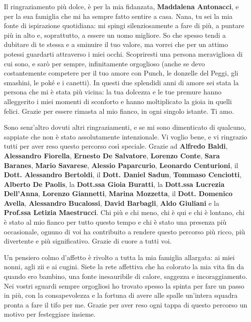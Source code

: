 \vspace{1em}

\noindent
Il ringraziamento più dolce, è per la mia fidanzata, \textbf{Maddalena Antonacci}, e per la sua famiglia che mi ha sempre fatto sentire a casa. Nana, tu sei la mia fonte di ispirazione quotidiana: mi spingi silenziosamente a fare di più, a puntare più in alto e, soprattutto, a essere un uomo migliore. So che spesso tendi a dubitare di te stessa e a sminuire il tuo valore, ma vorrei che per un attimo potessi guardarti attraverso i miei occhi. Scopriresti una persona meravigliosa di cui sono, e sarò per sempre, infinitamente orgoglioso (anche se devo costantemente competere per il tuo amore con Punch, le donzelle del Peggi, gli smashini, le poké e i canetti). In questi due splendidi anni di amore sei stata la persona che mi è stata più vicina: la tua dolcezza e le tue premure hanno alleggerito i miei momenti di sconforto e hanno moltiplicato la gioia in quelli felici. Grazie per essere rimasta al mio fianco, in ogni singolo istante. Ti amo.

\vspace{1em}

\noindent
Sono senz'altro dovuti altri ringraziamenti, e se mi sono dimenticato di qualcuno, sappiate che non è stato assolutamente intenzionale. Vi voglio bene, e vi ringrazio tutti per aver reso questo percorso così speciale.
Grazie ad \textbf{Alfredo Baldi}, \textbf{Alessandro Fiorella}, \textbf{Ernesto De Salvatore}, \textbf{Lorenzo Conte}, \textbf{Sara Baranes}, \textbf{Mario Savarese}, \textbf{Alessio Paparcurio}, \textbf{Leonardo Centurioni}, il \textbf{Dott. Alessandro Bertoldi}, il \textbf{Dott. Daniel Sadun}, \textbf{Tommaso Cenciotti}, \textbf{Alberto De Paolis}, la \textbf{Dott.ssa Gioia Buratti}, la \textbf{Dott.ssa Lucrezia Dell'Anna}, \textbf{Lorenzo Giannetti}, \textbf{Marina Mozzetta}, il \textbf{Dott. Domenico Avella}, \textbf{Alessandro Bucalossi}, \textbf{David Barbagli}, \textbf{Aldo Giuliani} e la \textbf{Prof.ssa Letizia Maestrucci}.
Chi più e chi meno, chi è qui e chi è lontano, chi è stato al mio fianco per tutto questo tempo e chi è stato una presenza più occasionale, ognuno di voi ha contribuito a rendere questo percorso più ricco, più divertente e più significativo. Grazie di cuore a tutti voi.

\vspace{1em}

\noindent
Un pensiero colmo d'affetto è rivolto a tutta la mia famiglia allargata: ai miei nonni, agli zii e ai cugini. Siete la rete affettiva che ha colorato la mia vita fin da quando ero bambino, una fonte inesauribile di calore, saggezza e incoraggiamento. Nei vostri sguardi sempre orgogliosi ho trovato spesso la spinta per fare un passo in più, con la consapevolezza e la fortuna di avere alle spalle un'intera squadra pronta a fare il tifo per me. Grazie per aver reso ogni tappa di questo percorso un motivo per festeggiare insieme.

